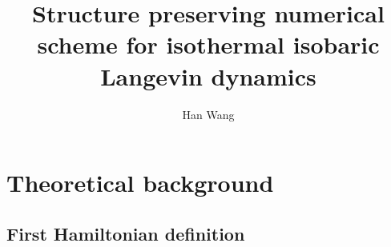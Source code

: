 \documentclass[aps, pre, preprint,unsortedaddress,a4paper,onecolumn]{revtex4}
\begin{document}
\title{Structure preserving numerical scheme for isothermal isobaric Langevin dynamics}
\author{Han Wang}
   
\begin{abstract}
\end{abstract}

\maketitle

\section{Theoretical background}
\subsection{First Hamiltonian definition}
\end{document}
